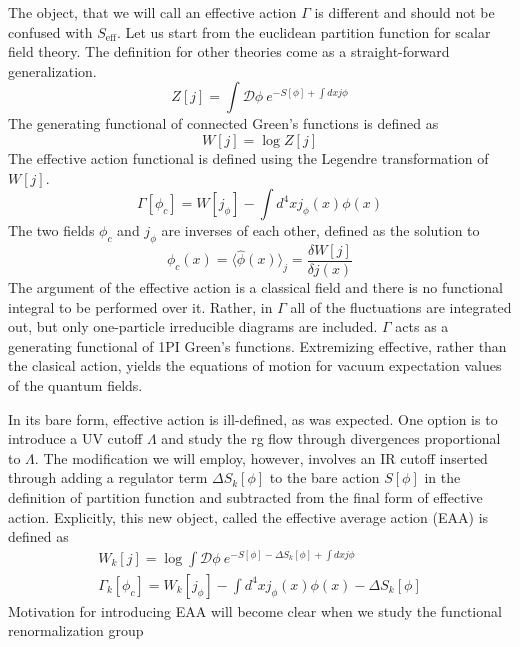\documentclass[11pt, a4paper]{article}
\begin{document}
The object, that we will call an effective action $\Gamma$ is different and should not be confused with $S_{\text{eff}}$.
Let us start from the euclidean partition function for scalar field theory. The definition for other theories
come as a straight-forward generalization.
\begin{equation}
    Z[j] = \int \mathcal{D}\phi \ e^{-S[\phi] + \int dx j \phi}
\end{equation}
The generating functional of connected Green's functions is defined as
\begin{equation}
    W[j] = \log{Z[j]}
\end{equation}
The effective action functional is defined using the Legendre transformation of $W[j]$.
\begin{equation}
    \Gamma[\phi_c] = W[j_\phi] - \int d^4 x j_\phi(x) \phi(x)
\end{equation}
The two fields $\phi_c$ and $j_\phi$ are inverses of each other, defined as the solution to
\begin{equation}
    \phi_c(x) = \langle \hat\phi (x) \rangle_j = \frac{\delta W[j]}{\delta j(x)}
\end{equation}
The argument of the effective action is a classical field and there is no functional integral to be performed over it.
Rather, in $\Gamma$ all of the fluctuations are integrated out, but only one-particle irreducible diagrams
are included. $\Gamma$ acts as a generating functional of 1PI Green's functions. Extremizing effective, rather than
the clasical action, yields the equations of motion for vacuum expectation values of the quantum fields.

In its bare form, effective action is ill-defined, as was expected. One option is to introduce a UV cutoff $\Lambda$
and study the rg flow through divergences proportional to $\Lambda$. The modification we will employ, however, involves
an IR cutoff inserted through adding a regulator term $\Delta S_k[\phi]$ to the bare action $S[\phi]$ in the definition of partition function
and subtracted from the final form of effective action. Explicitly, this new object, called the effective average action (EAA) is defined as
\begin{gather}
    W_k[j] = \log{\int \mathcal{D}\phi \ e^{-S[\phi] - \Delta S_k[\phi] + \int dx j \phi}}\\
    \Gamma_k[\phi_c] = W_k[j_\phi] - \int d^4 x j_\phi(x) \phi(x) - \Delta S_k[\phi]
\end{gather}
Motivation for introducing EAA will become clear when we study the functional renormalization group
\end{document}

